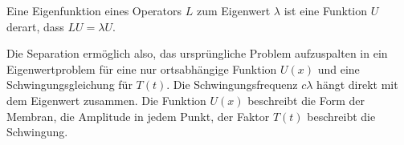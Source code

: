 \begin{definition}
Eine Eigenfunktion eines Operators $L$ zum Eigenwert $\lambda$
ist eine Funktion $U$ derart, dass $LU=\lambda U$.
\end{definition}

Die Separation ermöglich also, das ursprüngliche Problem aufzuspalten
in ein Eigenwertproblem für eine nur ortsabhängige Funktion $U(x)$
und eine Schwingungsgleichung für $T(t)$.
Die Schwingungsfrequenz $c \lambda $ hängt direkt mit dem
Eigenwert zusammen.
Die Funktion $U(x)$ beschreibt die Form der Membran, die Amplitude
in jedem Punkt, der Faktor $T(t)$ beschreibt die Schwingung.


